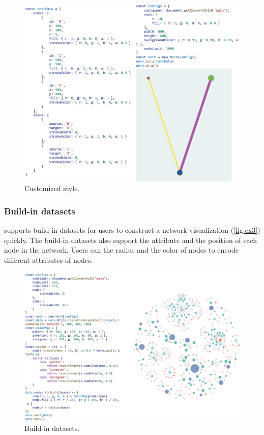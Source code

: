 \begin{figure}[htbp]
    \includegraphics[width=\linewidth]{fig/ex1.eps}
    \caption{
        Customized style.
    }
    \label{fig:ex1}
\end{figure}

\subsubsection{Build-in datasets}
\name supports build-in datasets for users to construct a network visualization (\autoref{fig:ex3}) quickly. The build-in datasets also support the attribute and the position of each node in the network.
Users can the radius and the color of nodes to encode different attributes of nodes.
\begin{figure}[htbp]
    \includegraphics[width=\linewidth]{fig/ex3.eps}
    \caption{
        Build-in datasets.
    }
    \label{fig:ex3}
\end{figure}

